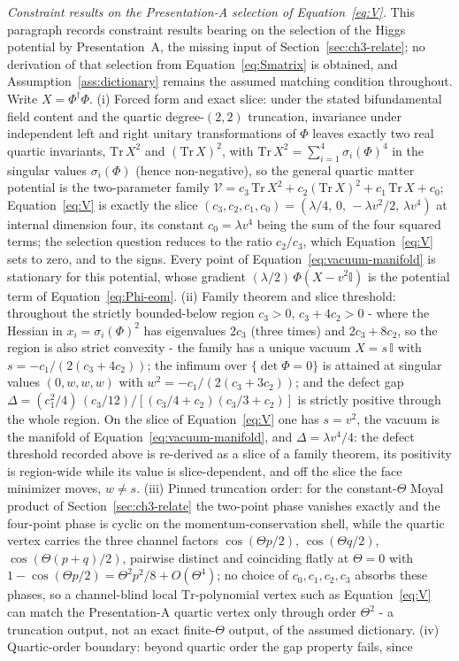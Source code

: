\emph{Constraint results on the Presentation-A selection of Equation~\eqref{eq:V}.} This paragraph records constraint results bearing on the selection of the Higgs potential by Presentation~A, the missing input of Section~\ref{sec:ch3-relate}; no derivation of that selection from Equation~\eqref{eq:Smatrix} is obtained, and Assumption~\ref{ass:dictionary} remains the assumed matching condition throughout. Write \(X=\Phi^\dagger\Phi\). (i) Forced form and exact slice: under the stated bifundamental field content and the quartic degree-\((2,2)\) truncation, invariance under independent left and right unitary transformations of \(\Phi\) leaves exactly two real quartic invariants, \(\mathrm{Tr}\,X^2\) and \((\mathrm{Tr}\,X)^2\), with \(\mathrm{Tr}\,X^2=\sum_{i=1}^4\sigma_i(\Phi)^4\) in the singular values \(\sigma_i(\Phi)\) (hence non-negative), so the general quartic matter potential is the two-parameter family \(\mathcal V=c_3\,\mathrm{Tr}\,X^2+c_2(\mathrm{Tr}\,X)^2+c_1\,\mathrm{Tr}\,X+c_0\); Equation~\eqref{eq:V} is exactly the slice \((c_3,c_2,c_1,c_0)=(\lambda/4,\,0,\,-\lambda v^2/2,\,\lambda v^4)\) at internal dimension four, its constant \(c_0=\lambda v^4\) being the sum of the four squared terms; the selection question reduces to the ratio \(c_2/c_3\), which Equation~\eqref{eq:V} sets to zero, and to the signs. Every point of Equation~\eqref{eq:vacuum-manifold} is stationary for this potential, whose gradient \((\lambda/2)\,\Phi(X-v^2\mathbb I)\) is the potential term of Equation~\eqref{eq:Phi-eom}. (ii) Family theorem and slice threshold: throughout the strictly bounded-below region \(c_3>0\), \(c_3+4c_2>0\) - where the Hessian in \(x_i=\sigma_i(\Phi)^2\) has eigenvalues \(2c_3\) (three times) and \(2c_3+8c_2\), so the region is also strict convexity - the family has a unique vacuum \(X=s\,\mathbb I\) with \(s=-c_1/(2(c_3+4c_2))\); the infimum over \(\{\det\Phi=0\}\) is attained at singular values \((0,w,w,w)\) with \(w^2=-c_1/(2(c_3+3c_2))\); and the defect gap \(\Delta=(c_1^2/4)\,(c_3/12)/[(c_3/4+c_2)(c_3/3+c_2)]\) is strictly positive through the whole region. On the slice of Equation~\eqref{eq:V} one has \(s=v^2\), the vacuum is the manifold of Equation~\eqref{eq:vacuum-manifold}, and \(\Delta=\lambda v^4/4\): the defect threshold recorded above is re-derived as a slice of a family theorem, its positivity is region-wide while its value is slice-dependent, and off the slice the face minimizer moves, \(w\ne s\). (iii) Pinned truncation order: for the constant-\(\Theta\) Moyal product of Section~\ref{sec:ch3-relate} the two-point phase vanishes exactly and the four-point phase is cyclic on the momentum-conservation shell, while the quartic vertex carries the three channel factors \(\cos(\Theta p/2)\), \(\cos(\Theta q/2)\), \(\cos(\Theta(p+q)/2)\), pairwise distinct and coinciding flatly at \(\Theta=0\) with \(1-\cos(\Theta p/2)=\Theta^2p^2/8+O(\Theta^4)\); no choice of \(c_0,c_1,c_2,c_3\) absorbs these phases, so a channel-blind local \(\mathrm{Tr}\)-polynomial vertex such as Equation~\eqref{eq:V} can match the Presentation-A quartic vertex only through order \(\Theta^2\) - a truncation output, not an exact finite-\(\Theta\) output, of the assumed dictionary. (iv) Quartic-order boundary: beyond quartic order the gap property fails, since 